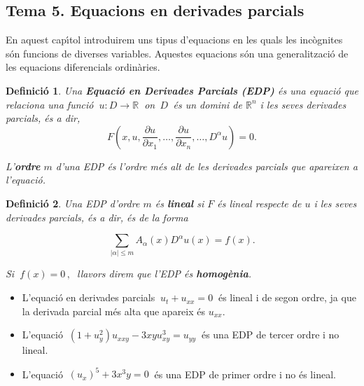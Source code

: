\documentclass[12pt]{article}
\newtheorem{definicio}{Definici{\'o}}[subsection]
\newcommand{\R}{\mathbb{R}}
\begin{document}
\pagestyle{fancy}
\fancyhead{}

\begin{center}
\section{Tema 5. Equacions en derivades parcials}
\end{center}

\parskip =0.3cm
\parindent =0cm
\itemindent=2cm

En aquest cap{\'\i}tol introduirem uns tipus d'equacions en les quals les inc{\`o}gnites s{\'o}n funcions de diverses variables. Aquestes equacions s{\'o}n una generalitzaci{\'o} de les equacions diferencials ordin{\`a}ries.


\vspace{0.4cm}
\begin{definicio}
Una \textbf{Equaci{\'o} en Derivades Parcials (EDP)} {\'e}s una equaci{\'o}  que relaciona una funci{\'o}
$\ u :D \rightarrow \R\ $ on $\,D\, $ {\'e}s un domini de $\R^n$ i les seves derivades parcials, {\'e}s a dir,
\vspace{0.3cm}
\begin{equation}\label{edp}
 F(x,u,\frac{\partial u}{\partial x_1},\ldots,\frac{\partial u}{\partial x_n},\ldots,D^\alpha u)=0.
\end{equation}

L'\textbf{ordre} $m$ d'una EDP {\'e}s l'ordre m{\'e}s alt de les derivades parcials que apareixen a l'equaci{\'o}.
\end{definicio}

\vspace{0.4cm}
\begin{definicio}
 Una EDP d'ordre $m$ {\'e}s \textbf{lineal} si $F$ {\'e}s lineal respecte de $u$ i les seves derivades parcials, {\'e}s a dir, {\'e}s de la forma

\[
 \sum_{|\alpha |\leq m} A_\alpha (x)D^{\alpha} u(x)=f(x).
\]

Si $\ f(x)=0\,,\ $ llavors direm que l'EDP {\'e}s \textbf{homog{\`e}nia}.
\end{definicio}

\vspace{0.4cm}
\begin{exemples}
\begin{itemize}
 \item L'equaci{\'o} en derivades parcials $\ u_t+u_{xx}=0\ $ {\'e}s lineal i de segon ordre, ja que la derivada parcial m{\'e}s alta que apareix {\'e}s $u_{xx}.$
\item L'equaci{\'o} $\ (1+u_y^2)u_{xxy}-3xyu_{xy}^3=u_{yy}\ $ {\'e}s una EDP de tercer ordre i no lineal.
\item L'equaci{\'o} $\ (u_x)^5+3x^3y=0\ $ {\'e}s una EDP de primer ordre i no {\'e}s lineal.
\end{itemize}
\end{exemples}
\end{document}
